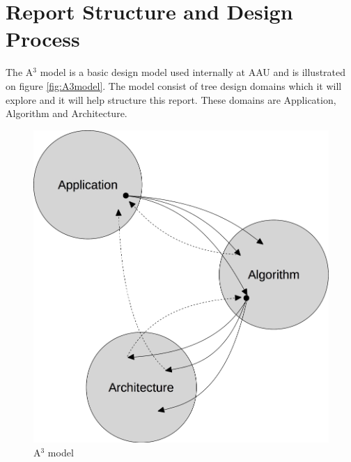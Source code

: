 \section{Report Structure and Design Process}
The A$^3$ model is a basic design model used internally at AAU and is illustrated on figure \vref{fig:A3model}. The model consist of tree design domains which it will explore and it will help structure this report. These domains are Application, Algorithm and Architecture.\\
\begin{figure}[ht!]
  \centering
  \includegraphics[scale=0.25]{figures/A3model.jpg}
  \caption{A$^3$ model}
  \label{fig:A3model}
\end{figure}

